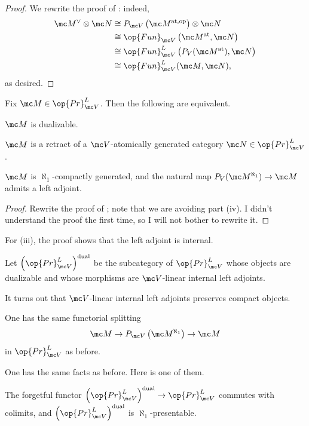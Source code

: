 \documentclass[../notes.tex]{subfiles}
\begin{document}
\begin{proof}
	We rewrite the proof of : indeed,
	\begin{align*}
		\mc M^\lor\otimes\mc N &\cong P_{\mc V}\left(\mc M^{\mathrm{at},\mathrm{op}}\right)\otimes\mc N \\
		&\cong \op{Fun}_{\mc V}\left(\mc M^{\mathrm{at}},\mc N\right) \\
		&\cong \op{Fun}_{\mc V}^L\left(P_V(\mc M^{\mathrm{at}}),\mc N\right) \\
		&\cong \op{Fun}_{\mc V}^L(\mc M,\mc N),
	\end{align*}
	as desired.
\end{proof}
\begin{theorem}
	Fix $\mc M\in\op{Pr}^L_{\mc V}$. Then the following are equivalent.
	\begin{listroman}
		\item $\mc M$ is dualizable.
		\item $\mc M$ is a retract of a $\mc V$-atomically generated category $\mc N\in\op{Pr}^L_{\mc V}$.
		\item $\mc M$ is $\aleph_1$-compactly generated, and the natural map $P_V(\mc M^{\aleph_1})\to\mc M$ admits a left adjoint.
	\end{listroman}
\end{theorem}
\begin{proof}
	Rewrite the proof of ; note that we are avoiding part (iv). I didn't understand the proof the first time, so I will not bother to rewrite it.
\end{proof}
\begin{remark}
	For (iii), the proof shows that the left adjoint is internal.
\end{remark}
\begin{definition}
	Let $\left(\op{Pr}^L_{\mc V}\right)^{\mathrm{dual}}$ be the subcategory of $\op{Pr}^L_{\mc V}$ whose objects are dualizable and whose morphisms are $\mc V$-linear internal left adjoints.
\end{definition}
\begin{remark}
	It turns out that $\mc V$-linear internal left adjoints preserves compact objects.
\end{remark}
\begin{remark}
	One has the same functorial splitting
	\[\mc M\to P_{\mc V}\left(\mc M^{\aleph_1}\right)\to\mc M\]
	in $\op{Pr}^L_{\mc V}$ as before.
\end{remark}
One has the same facts as before. Here is one of them.
\begin{proposition}
	The forgetful functor $\left(\op{Pr}^L_{\mc V}\right)^{\mathrm{dual}}\to\op{Pr}^L_{\mc V}$ commutes with colimits, and $\left(\op{Pr}^L_{\mc V}\right)^{\mathrm{dual}}$ is $\aleph_1$-present\-able.
\end{proposition}
\end{document}

